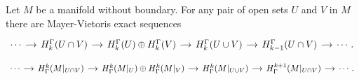 \begin{theorem}\label{T: relative MV}
Let $M$ be a manifold without boundary. For any pair of open sets $U$ and $V$ in $M$ there are Mayer-Vietoris exact sequences 
\begin{equation*}
\begin{tikzcd}[
column sep=small,
arrow style=math font,
cells={nodes={text height=2ex,text depth=0.75ex}}
]
\cdots  \arrow[r] & H^{\Gamma}_{k}(U \cap V)  \arrow[r] & H^{\Gamma}_k(U) \oplus H^{\Gamma}_{k}(V)
 \arrow[r]  & H_{k}^{\Gamma}(U \cup V) \arrow[r] &  H_{k-1}^{\Gamma}(U \cap V) \arrow[r] & \cdots.
\end{tikzcd}
\end{equation*}
\begin{equation*}
\begin{tikzcd}[
column sep=small,
arrow style=math font,
cells={nodes={text height=2ex,text depth=0.75ex}}
]
\cdots  \arrow[r] & H_{\Gamma}^{k}(M|_{U \cap V})  \arrow[r] & H_{\Gamma}^k(M|_U) \oplus H_{\Gamma}^{k}(M|_V)
 \arrow[r]  & H^{k}_{\Gamma}(M|_{U \cup V}) \arrow[r] &  H^{k+1}_{\Gamma}(M|_{U \cap V}) \arrow[r] & \cdots.
\end{tikzcd}
\end{equation*}
\end{theorem}

